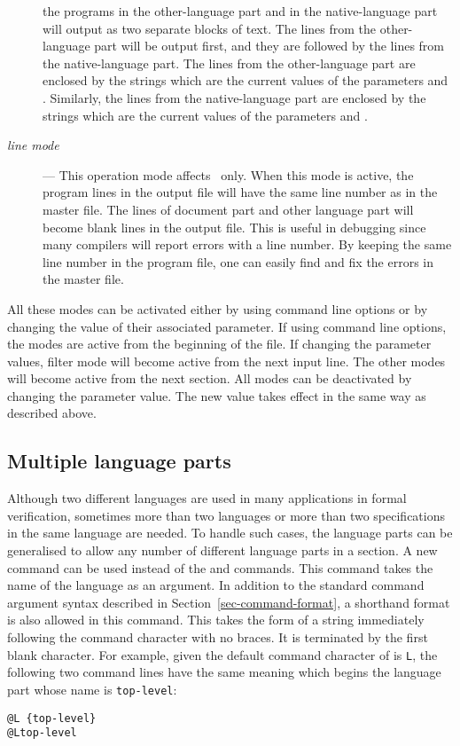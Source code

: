\begin{description}
the programs in the other-language part and in the native-language
part will output as two separate blocks of text. The lines from the
other-language part will be output first, and they are followed by the
lines from the native-language part.
The lines from the other-language part are enclosed by the
strings which are the current values of the parameters
 and . Similarly, the lines
from the native-language part are enclosed by the
strings which are the current values of the parameters
 and .
\item[{\it line mode}]---
This operation mode affects \tangle\ only. When this mode is active,
the program lines in the output file will have the same line
number as in the master file. The lines of document part and other
language part will become blank lines in the output file. This is
useful in debugging since many compilers will report errors with a line
number. By keeping the same line number in the program file, one can
easily find and fix the errors in the master file.
\end{description}
All these modes can be activated either by using command line options
or by changing the value of their associated parameter. If
using command line options, the modes are active from the beginning of
the file. If changing the parameter values, filter mode will become
active from the next input line. The other modes will become active
from the next section. All modes can be deactivated by changing the
parameter value. The new value takes effect in the same way as
described above.

\subsection{Multiple language parts}

Although two different languages are used in many applications in
formal verification, sometimes more than two languages or more than
two specifications in the same language are needed. To handle such
cases, the language parts can be generalised to allow any number of
different language parts in a section. A new command
 can be used instead of the  and
 commands. This command takes the name of the
language as an argument. In addition to the standard command argument
syntax described in Section~\ref{sec-command-format}, a shorthand
format is also allowed in this command. This takes the form of a
string immediately following the command character with no braces. It
is terminated by the first blank character. For example, given the
default command character of  is {\tt L}, the following
two command lines have the same meaning which begins the language part
whose name is {\tt top-level}:
\begin{verbatim}
@L {top-level}
@Ltop-level
\end{verbatim}


